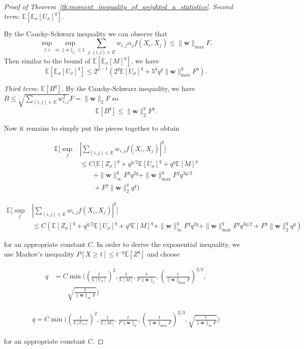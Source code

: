 \documentclass[letterpaper]{article} %
\def\DoubleColumn{}
\def\DoubleColumnEnd{}
\def\SingleColumn{}
\def\SingleColumnEnd{}
\newcommand{\E}{\mathbb{E}}
\newcommand{\Pro}{P}
\newcommand{\weight}{\mathbf{w}}
\newcommand{\rademacher}{\sigma}
\newcommand{\pair}[1]{(#1)}
\begin{document}
\begin{proof}[Proof of Theorem~\ref{th:moment_inequality_of_weighted_u_statistics}]
\textit{Second term:} $\E[\E_\rademacher[U_\rademacher]^q].$

By the Cauchy-Schwarz inequality we can observe that
\[\sup_{f,i}\sup_{\alpha:\|\alpha\|_2\le 1}\sum_{j:\pair{i,j}\in E}w_{i,j}\alpha_jf(X_i,X_j)\le \|\weight{}\|_{\max}F.\]
Then similar to the bound of $\E[\E_\rademacher[M]^q]$, we have
\[\E[\E_\rademacher[U_\rademacher]^q]\le 2^{q-1}(2^q\E[U_\rademacher]^q+5^qq^q\|\weight{}\|_{\max}^qF^q).\]

\textit{Third term:} $\E[B^q]$. By the Cauchy-Schwarz inequality, we have $B\le \sqrt{\sum_{\pair{i,j}\in E}w_{i,j}^2}F= \|\weight{}\|_2F$ so
\[\E[B^q]\le \|\weight{}\|_2^qF^q.\]

Now it remains to simply put the pieces together to obtain
\DoubleColumn
\begin{align*}
\E[\sup_f&|\sum_{\pair{i,j}\in E}w_{i,j} f(X_i,X_j)|^q]\\
&\le C(\E[Z_\rademacher]^q+q^{q/2}\E[U_\rademacher]^q+q^q\E[M]^q\\
&\qquad+\|\weight{}\|_\infty^q F^qq^{2q}+\|\weight{}\|_{\max}^qF^qq^{3q/2}\\
&\qquad+F^q\|\weight{}\|_2^qq^q)
\end{align*}
\DoubleColumnEnd
\SingleColumn
\begin{align*}
\E[\sup_f&|\sum_{\pair{i,j}\in E}w_{i,j} f(X_i,X_j)|^q]\\
&\le C(\E[Z_\rademacher]^q+q^{q/2}\E[U_\rademacher]^q+q^q\E[M]^q+\|\weight{}\|_\infty^q F^qq^{2q}+\|\weight{}\|_{\max}^qF^qq^{3q/2}+F^q\|\weight{}\|_2^qq^q)
\end{align*}
\SingleColumnEnd
for an appropriate constant $C$. 
In order to derive the exponential inequality, we use Markov's inequality $\Pro[X\ge t]\le t^{-q}\E[Z^q]$ and choose
\DoubleColumn
\begin{align*}
    q&=C\min\Big((\frac{t}{\E[U_\rademacher]})^2,\frac{t}{\E[M]},\frac{t}{F\|\weight{}\|_2},(\frac{t}{\|\weight{}\|_{\max} F})^{2/3},\\
    &\qquad\sqrt{\frac{t}{\|\weight{}\|_\infty F}}\Big)
\end{align*}
\DoubleColumnEnd
\SingleColumn
\begin{align*}
    q=C\min\Big((\frac{t}{\E[U_\rademacher]})^2,\frac{t}{\E[M]},\frac{t}{F\|\weight{}\|_2},(\frac{t}{\|\weight{}\|_{\max} F})^{2/3},\sqrt{\frac{t}{\|\weight{}\|_\infty F}}\Big)
\end{align*}
\SingleColumnEnd
for an appropriate constant $C$.
\end{proof}
\end{document}
